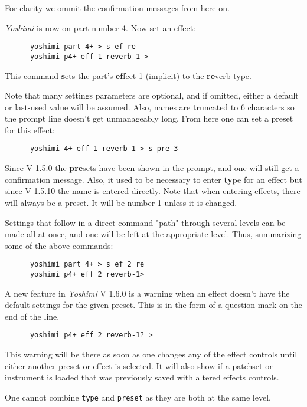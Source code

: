    For clarity we ommit the confirmation messages from here on.

   \textsl{Yoshimi} is now on part number 4. Now set an effect:

   \begin{verbatim}
      yoshimi part 4+ > s ef re
      yoshimi p4+ eff 1 reverb-1 >
   \end{verbatim}

   This command \textbf{s}ets the part's \textbf{ef}fect 1 (implicit) to
   the \textbf{re}verb type.

   Note that many settings parameters are optional, and if omitted,
   either a default or last-used value will be assumed. Also, names are
   truncated to 6 characters so the prompt line doesn't get unmanageably long.
   From here one can set a preset for this effect:

   \begin{verbatim}
      yoshimi 4+ eff 1 reverb-1 > s pre 3
   \end{verbatim}

   Since V 1.5.0 the \textbf{pre}sets have been shown in the prompt, and one
   will still get a confirmation message. Also, it used to be necessary to
   enter \textbf{ty}pe for an effect but since V 1.5.10 the name is entered directly.
   Note that when entering effects, there will always be a preset. It will be number 1
   unless it is changed.

   Settings that follow in a direct command "path" through several levels
   can be made all at once, and one will be left at the appropriate level.
   Thus, summarizing some of the above commands:

   \begin{verbatim}
      yoshimi part 4+ > s ef 2 re
      yoshimi p4+ eff 2 reverb-1>
   \end{verbatim}

   A new feature in \textsl{Yoshimi} V 1.6.0 is a warning when an effect doesn't have the default
   settings for the given preset. This is in the form of a question mark on the end of the line.
   \begin{verbatim}
      yoshimi p4+ eff 2 reverb-1? >
   \end{verbatim}
   This warning will be there as soon as one changes any of the effect controls until either
   another preset or effect is selected. It will also show if a patchset or instrument is loaded
   that was previously saved with altered effects controls.

   One cannot combine \texttt{type} and \texttt{preset} as they
   are both at the same level.

